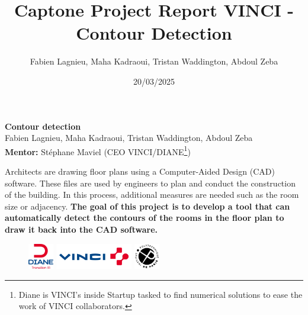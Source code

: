\documentclass[11pt]{article}
\title{Captone Project Report VINCI - Contour Detection}
\author{Fabien Lagnieu, Maha Kadraoui, Tristan Waddington, Abdoul Zeba}
\date{20/03/2025}
\begin{document}
\begin{center}
\textbf{Contour detection} \\
Fabien Lagnieu, Maha Kadraoui, Tristan Waddington, Abdoul Zeba\\
\textbf{Mentor:} Stéphane Maviel (CEO VINCI/DIANE\footnote{Diane is VINCI's inside Startup tasked to find numerical solutions
to ease the work of VINCI collaborators.}) \\\vspace{2em}
\textbf{\Large }
\end{center}
\vspace{-1cm}

Architects are drawing floor plans using a Computer-Aided Design (CAD) software. These files are used
by engineers to plan and conduct the construction of the building. In this process,
additional measures are needed such as the room size or adjacency. \textbf{The goal of 
this project is to develop a tool that can automatically detect the contours of 
the rooms in the floor plan to draw it back into the CAD software.}

\begin{figure}[h]
    \centering
    \includegraphics[width=0.1\textwidth]{figures/Diane.png}
    \hspace{0.1\textwidth}
    \includegraphics[width=0.3\textwidth]{figures/logo_vinci.png}
    \hspace{0.1\textwidth}
    \includegraphics[width=0.1\textwidth]{figures/ipparis.png}

    \label{fig:my_label}
\end{figure}
\end{document}
